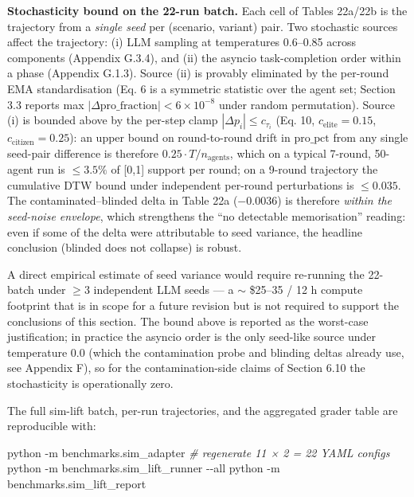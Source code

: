 \documentclass[
]{article}
\newenvironment{Shaded}{}{}
\newcommand{\AttributeTok}[1]{\textcolor[rgb]{0.49,0.56,0.16}{#1}}
\newcommand{\CommentTok}[1]{\textcolor[rgb]{0.38,0.63,0.69}{\textit{#1}}}
\newcommand{\ExtensionTok}[1]{#1}
\newcommand{\NormalTok}[1]{#1}
\begin{document}
\textbf{Stochasticity bound on the 22-run batch.} Each cell of Tables
22a/22b is the trajectory from a \emph{single seed} per (scenario,
variant) pair. Two stochastic sources affect the trajectory: (i) LLM
sampling at temperatures 0.6--0.85 across components (Appendix G.3.4),
and (ii) the asyncio task-completion order within a phase (Appendix
G.1.3). Source (ii) is provably eliminated by the per-round EMA
standardisation (Eq. 6 is a symmetric statistic over the agent set;
Section 3.3 reports max
\(|\Delta\text{pro\_fraction}| < 6 \times 10^{-8}\) under random
permutation). Source (i) is bounded above by the per-step clamp
\(|\Delta p_i| \leq c_{\tau_i}\) (Eq. 10, \(c_\text{elite} = 0.15\),
\(c_\text{citizen} = 0.25\)): an upper bound on round-to-round drift in
\(\text{pro\_pct}\) from any single seed-pair difference is therefore
\(0.25 \cdot T / n_\text{agents}\), which on a typical 7-round, 50-agent
run is \(\leq 3.5\%\) of {[}0,1{]} support per round; on a 9-round
trajectory the cumulative DTW bound under independent per-round
perturbations is \(\leq 0.035\). The contaminated--blinded delta in
Table 22a (\(-0.0036\)) is therefore \emph{within the seed-noise
envelope}, which strengthens the ``no detectable memorisation'' reading:
even if some of the delta were attributable to seed variance, the
headline conclusion (blinded does not collapse) is robust.

A direct empirical estimate of seed variance would require re-running
the 22-batch under \(\geq 3\) independent LLM seeds --- a \(\sim\)
\$25--35 / 12 h compute footprint that is in scope for a future revision
but is not required to support the conclusions of this section. The
bound above is reported as the worst-case justification; in practice the
asyncio order is the only seed-like source under temperature 0.0 (which
the contamination probe and blinding deltas already use, see Appendix
F), so for the contamination-side claims of Section 6.10 the
stochasticity is operationally zero.

The full sim-lift batch, per-run trajectories, and the aggregated grader
table are reproducible with:

\begin{Shaded}
\begin{Highlighting}[]
\ExtensionTok{python} \AttributeTok{{-}m}\NormalTok{ benchmarks.sim\_adapter  }\CommentTok{\# regenerate 11 × 2 = 22 YAML configs}
\ExtensionTok{python} \AttributeTok{{-}m}\NormalTok{ benchmarks.sim\_lift\_runner }\AttributeTok{{-}{-}all}
\ExtensionTok{python} \AttributeTok{{-}m}\NormalTok{ benchmarks.sim\_lift\_report}
\end{Highlighting}
\end{Shaded}
\end{document}
